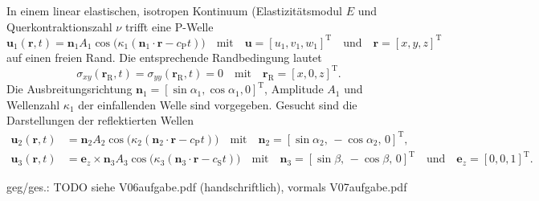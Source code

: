

In einem linear elastischen, isotropen Kontinuum (Elastizitätsmodul $E$ und Querkontraktionszahl $\nu$ trifft eine P-Welle
\begin{equation*}
\mathbf{u}_1(\mathbf{r},t)=\mathbf{n}_1 A_1 \cos\bigl(\kappa_1 (\mathbf{n}_1\cdot \mathbf{r}-c_\mathrm{P}t)\bigr) 
\quad \text{mit} \quad
\mathbf{u}=[u_1,v_1,w_1]^\mathrm{T}
\quad \text{und} \quad
\mathbf{r}=[x,y,z]^\mathrm{T}
\end{equation*}
auf einen freien Rand. Die entsprechende Randbedingung lautet
\begin{equation*}
\sigma_{xy}(\mathbf{r}_\mathrm{R},t) = \sigma_{yy}(\mathbf{r}_\mathrm{R},t) = 0
\quad \text{mit} \quad
\mathbf{r}_\mathrm{R}=[x,0,z]^\mathrm{T}. 
\end{equation*}
Die Ausbreitungsrichtung $\mathbf{n}_1=[\sin\alpha_1, \cos\alpha_1, 0]^\mathrm{T}$, Amplitude $A_1$ und Wellenzahl $\kappa_1$ der einfallenden Welle sind vorgegeben.
Gesucht sind die Darstellungen der reflektierten Wellen
\begin{align*}
 \mathbf{u}_2(\mathbf{r},t) &= \mathbf{n}_2 A_2 \cos\bigl(\kappa_2 (\mathbf{n}_2\cdot \mathbf{r}-c_\mathrm{P}t)\bigr)
 \quad \text{mit} \quad
 \mathbf{n}_2=[\sin\alpha_2,\, -\cos\alpha_2,\, 0]^\mathrm{T}, \\
 \mathbf{u}_3(\mathbf{r},t) &= \mathbf{e}_z\times\mathbf{n}_3 A_3 \cos\bigl(\kappa_3 (\mathbf{n}_3\cdot \mathbf{r}-c_\mathrm{S}t)\bigr)
 \quad \text{mit} \quad
 \mathbf{n}_3=[\sin\beta,\, -\cos\beta,\, 0]^\mathrm{T}
 \quad \text{und} \quad
 \mathbf{e}_z=[0,0,1]^\mathrm{T}.
\end{align*}

 geg/ges.: TODO siehe V06aufgabe.pdf (handschriftlich), vormals V07aufgabe.pdf
